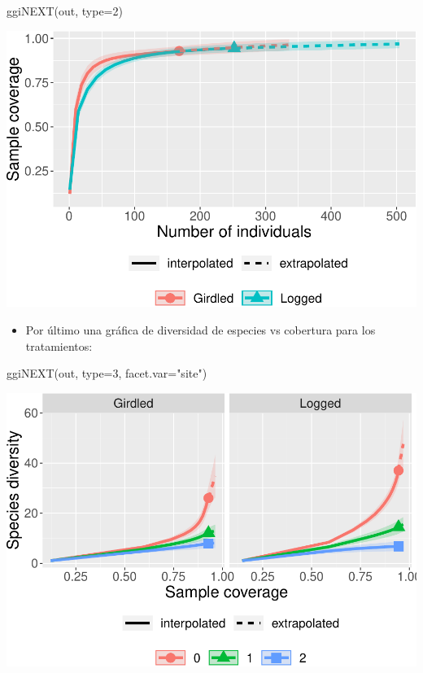 \documentclass[
]{article}
\newenvironment{Shaded}{\begin{snugshade}}{\end{snugshade}}
\newcommand{\AttributeTok}[1]{\textcolor[rgb]{0.77,0.63,0.00}{#1}}
\newcommand{\DecValTok}[1]{\textcolor[rgb]{0.00,0.00,0.81}{#1}}
\newcommand{\FunctionTok}[1]{\textcolor[rgb]{0.00,0.00,0.00}{#1}}
\newcommand{\NormalTok}[1]{#1}
\newcommand{\StringTok}[1]{\textcolor[rgb]{0.31,0.60,0.02}{#1}}
\providecommand{\tightlist}{%
  \setlength{\itemsep}{0pt}\setlength{\parskip}{0pt}}
\begin{document}
\begin{Shaded}
\begin{Highlighting}[]
\FunctionTok{ggiNEXT}\NormalTok{(out, }\AttributeTok{type=}\DecValTok{2}\NormalTok{)}
\end{Highlighting}
\end{Shaded}

\includegraphics{Clase1-bioest_files/figure-latex/unnamed-chunk-36-1.pdf}

\newpage

\begin{itemize}
\tightlist
\item
  Por último una gráfica de diversidad de especies vs cobertura para los
  tratamientos:
\end{itemize}

\begin{Shaded}
\begin{Highlighting}[]
\FunctionTok{ggiNEXT}\NormalTok{(out, }\AttributeTok{type=}\DecValTok{3}\NormalTok{, }\AttributeTok{facet.var=}\StringTok{"site"}\NormalTok{)}
\end{Highlighting}
\end{Shaded}

\includegraphics{Clase1-bioest_files/figure-latex/unnamed-chunk-37-1.pdf}
\end{document}
